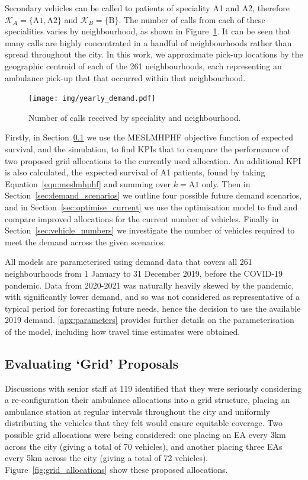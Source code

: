 \documentclass[numbers,webpdf,imaman]{ima-authoring-template}%
\begin{document}
Secondary vehicles can be called to patients of speciality A1 and A2,
therefore $\mathcal{K}_A = \{\text{A1}, \text{A2}\}$ and
$\mathcal{K}_B = \{\text{B}\}$.
The number of calls from each of these specialities varies by neighbourhood,
as shown in Figure~\ref{fig:yearly_demand}. It can be seen that many calls are
highly concentrated in a handful of neighbourhoods rather than spread
throughout the city. In this work, we approximate pick-up locations by the
geographic centroid of each of the 261 neighbourhoods, each representing an
ambulance pick-up that that occurred within that neighbourhood.

\begin{figure}
\begin{center}
\texttt{[image: img/yearly\_demand.pdf]}
\end{center}
\caption{Number of calls received by speciality and neighbourhood.}
\label{fig:yearly_demand}
\end{figure}


Firstly, in Section~\ref{sec:analysis_grid} we use the MESLMHPHF objective
function of expected survival, and the simulation, to find KPIs that to compare
the performance of two proposed grid allocations to the currently used
allocation. An additional KPI is also calculated, the expected survival of A1
patients, found by taking Equation~\ref{eqn:meslmhphf} and summing over
$k = \text{A1}$ only.
Then in Section~\ref{sec:demand_scenarios} we outline four possible
future demand scenarios, and in Section~\ref{sec:optimise_current} we use the
optimisation model to find and compare improved allocations for the current
number of vehicles. Finally in Section~\ref{sec:vehicle_numbers} we investigate
the number of vehicles required to meet the demand across the given scenarios.

All models are parameterised using demand data that covers all 261
neighbourhoods from 1 January to 31 December 2019, before the COVID-19
pandemic. Data from 2020-2021 was naturally heavily skewed by the pandemic,
with significantly lower demand, and so was not considered as representative
of a typical period for forecasting future needs, hence the decision to use
the available 2019 demand. \ref{apx:parameters} provides further details on the
parameterisation of the model, including how travel time estimates were
obtained.


\subsection{Evaluating `Grid' Proposals}\label{sec:analysis_grid}
Discussions with senior staff at 119 identified that they were seriously
considering a re-configuration their ambulance allocations into a grid
structure, placing an ambulance station at regular intervals throughout the city
and uniformly distributing the vehicles that they felt would ensure equitable
coverage. Two possible grid allocations were being considered: one placing an
EA every 3km across the city (giving a total of 70 vehicles), and another
placing three EAs every 5km across the city (giving a total of 72 vehicles).
Figure~\ref{fig:grid_allocations} show these proposed allocations.
\end{document}
